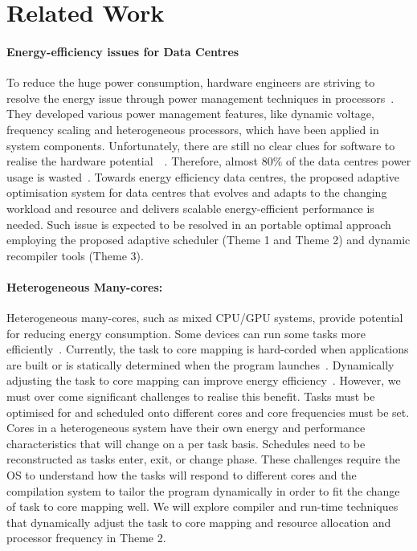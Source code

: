 \section{Related Work}
\paragraph{Energy-efficiency issues for Data Centres}
To reduce the huge power consumption, hardware engineers are striving to resolve the energy issue through power management techniques in processors~\cite{chanandopp}. They developed various power management features, like dynamic voltage, frequency scaling and heterogeneous processors, which have been applied in system components. Unfortunately, there are still no clear clues for software to realise the hardware potential~\cite{lookbackandfor}~\cite{towardsenergyeff}. Therefore, almost 80\% of the data centres power usage is wasted~\cite{thecaseforepc}. Towards energy efficiency data centres, the proposed adaptive optimisation system for data centres that evolves and adapts to the changing workload and resource and delivers scalable energy-efficient performance is needed. Such issue is expected to be resolved in an portable optimal approach employing the proposed adaptive scheduler (Theme 1 and Theme 2) and dynamic recompiler tools (Theme 3).


\paragraph{Heterogeneous Many-cores:} Heterogeneous many-cores, such as mixed CPU/GPU systems,
provide potential for
reducing energy consumption. Some devices can run some tasks more
efficiently~\cite{Cong:2012}. Currently, the task to core mapping is
hard-corded when applications are built or is statically
determined when the program launches~\cite{cc11grewe}. Dynamically adjusting
the task to core mapping can improve energy efficiency~\cite{4550857}. However,
we must over come significant challenges to realise this benefit. Tasks must
be optimised for and scheduled onto different cores and core frequencies must
be set. Cores in a heterogeneous system have their own energy and performance
characteristics that will change on a per task basis. Schedules need to be
reconstructed as tasks enter, exit, or change phase. These challenges require
the OS to understand how the tasks will respond to different cores and the
compilation system to tailor the program dynamically in order to fit the
change of task to core mapping well. We will explore compiler and run-time
techniques that dynamically adjust the task to core mapping and resource
allocation and processor frequency in Theme 2.

